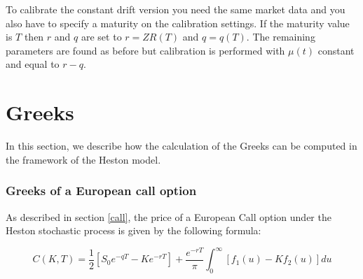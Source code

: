 To calibrate the constant drift version you need the same market data and you also have to specify a maturity on the calibration settings. If the maturity value is $T$ then $r$ and $q$ are set to $r = ZR(T)$ and $q = q(T)$. The remaining parameters are found as before but calibration is performed with $\mu(t)$ constant and equal to $r-q$.




\section{Greeks}
In this section, we describe how the calculation of the Greeks can be computed in the framework of the Heston model. 


\subsubsection{Greeks of a European call option}
As described in section \ref{call}, the price of a European Call option under the Heston stochastic process is given by the following formula:

$$
C(K,T) = \frac{1}{2}\left[S_0e^{-q T} - Ke^{-r T}\right] + \frac{e^{-r T}}{\pi}\int_0^{\infty}\left[f_1(u) - Kf_2(u)\right]du
$$



